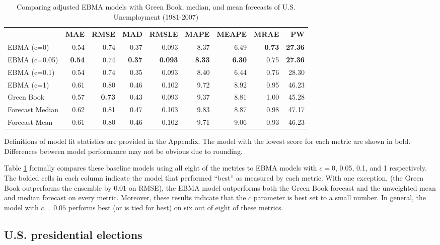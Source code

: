 \documentclass[12pt,fullpage,endnotes]{article}
\begin{document}
\begin{table}[h]
\caption{Comparing adjusted EBMA models with Green Book, median, and mean forecasts of U.S. Unemployment (1981-2007)}
\begin{center}
\begin{tabular}{lrrrrrrrr}
\toprule
 & MAE & RMSE & MAD & RMSLE & MAPE & MEAPE & MRAE & PW \\ 
\midrule
 EBMA (c=0)& 0.54 & 0.74 & 0.37 & 0.093 & 8.37 & 6.49 & \textbf{0.73} & \textbf{27.36} \\ 
  EBMA (c=0.05)& \textbf{0.54} & 0.74 &\textbf{ 0.37} & \textbf{0.093} & \textbf{8.33} & \textbf{6.30} & 0.75 & \textbf{27.36} \\ 
 EBMA (c=0.1)& 0.54 & 0.74 & 0.35 & 0.093 & 8.40 & 6.44 & 0.76 & 28.30 \\ 
EBMA (c=1) & 0.61 & 0.80 & 0.46 & 0.102 & 9.72 & 8.92 & 0.95 & 46.23 \\ 
 Green Book& 0.57 & \textbf{0.73} & 0.43 & 0.093 & 9.37 & 8.81 & 1.00 & 45.28 \\ 
 Forecast Median& 0.62 & 0.81 & 0.47 & 0.103 & 9.83 & 8.87 & 0.98 & 47.17 \\ 
Forecast Mean& 0.61 & 0.80 & 0.46 & 0.102 & 9.71 & 9.06 & 0.93 & 46.23 \\ 
\bottomrule
\end{tabular}
\end{center}

\label{compareTable1}
Definitions of model fit statistics are provided in the Appendix. The model with the lowest score for each metric are shown in bold.  Differences between model performance may not be obvious due to rounding.
\end{table}


Table \ref{compareTable1} formally compares these baseline models
using all eight of the metrics to EBMA models with $c=$0, 0.05, 0.1,
and 1 respectively.  The bolded cells in each column indicate the
model that performed ``best'' as measured by each metric.  With one
exception, (the Green Book outperforms the ensemble by 0.01 on RMSE),
the EBMA model outperforms both the Green Book forecast and the
unweighted mean and median forecast on every metric.  Moreover, these
results indicate that the $c$ parameter is best set to a small number.
In general, the model with $c=0.05$ performs best (or is tied for
best) on six out of eight of these metrics.




\subsection{U.S. presidential elections}
\end{document}
